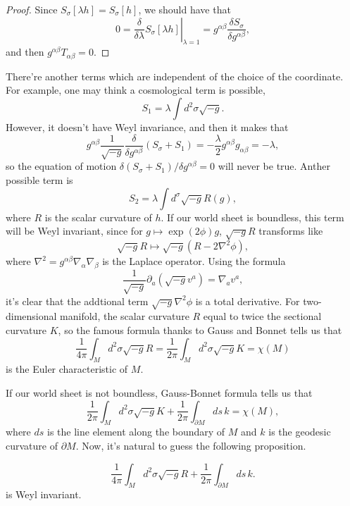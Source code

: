 \begin{proof}
	Since $S_\sigma[\lambda h]=S_\sigma[h]$, we should have that
	\[
		0=\left.\frac{\delta}{\delta \lambda}S_\sigma[\lambda h]
		\right |_{\lambda=1}
		=g^{\alpha\beta}\frac{\delta S_\sigma}{\delta g^{\alpha\beta}},
	\]
	and then $g^{\alpha\beta}T_{\alpha\beta}=0$.
\end{proof}


There're another terms which are independent of the choice
of the coordinate. For example, one may think a cosmological
term is possible,
\[
	S_1=\lambda \int d^2\sigma \sqrt{-g}.
\]
However, it doesn't have Weyl invariance, and then it 
makes that
\[
	g^{\alpha\beta}\frac{1}{\sqrt{-g}}
	\frac{\delta}{\delta g^{\alpha\beta}} (S_\sigma+S_1)=
	-\frac{\lambda}{2}g^{\alpha\beta}g_{\alpha\beta}=-\lambda,
\]
so the equation of motion 
$\delta (S_\sigma+S_1)/\delta g^{\alpha\beta}=0$ will never 
be true. Anther possible term is 
\[
	S_2=\lambda \int d^\sigma \sqrt{-g} R(g),
\]
where $R$ is the scalar curvature of $h$. 
If our world sheet is boundless, this term will be Weyl 
invariant, since for $g\mapsto \exp(2\phi)g$, $\sqrt{-g}R$ 
transforms like
\[
\sqrt{-g}R\longmapsto \sqrt{-g}(R-2\nabla^2 \phi),
\]
where $\nabla^2=g^{\alpha\beta}\nabla_\alpha\nabla_\beta$
is the Laplace operator. Using the formula
\[
	\frac{1}{\sqrt{-g}}\partial_a (\sqrt{-g}v^a)=\nabla_a v^a,
\]
it's clear that the addtional term $\sqrt{-g}\nabla^2 \phi$
is a total derivative. For two-dimensional manifold, the
scalar curvature $R$ equal to twice the sectional curvature 
$K$, so the famous formula thanks to Gauss and Bonnet 
tells us that
\[
	\frac{1}{4\pi}\int_M d^2\sigma \sqrt{-g} R
	=\frac{1}{2\pi}\int_M d^2\sigma \sqrt{-g} K=
	\chi (M)
\]
is the Euler characteristic of $M$.

If our world sheet is not boundless, Gauss-Bonnet formula
tells us that 
\[
	\frac{1}{2\pi}\int_M d^2\sigma \sqrt{-g} K+
	\frac{1}{2\pi}\int_{\partial M}ds \,k=\chi(M),
\]
where $ds$ is the line element along the boundary of $M$
and $k$ is the geodesic curvature of $\partial M$. Now,
it's natural to guess the following proposition.

\begin{pro}
\[
\frac{1}{4\pi} \int_M d^2\sigma \sqrt{-g} R+
\frac{1}{2\pi}\int_{\partial M}ds\, k.
\]
is Weyl invariant.
\end{pro}

